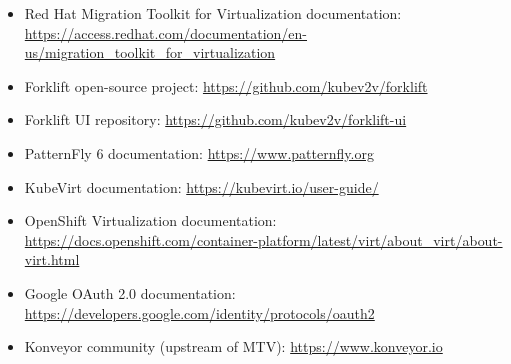 \documentclass[12pt,a4paper]{article}
\begin{document}
\begin{itemize}
  \item Red Hat Migration Toolkit for Virtualization documentation: \\ \url{https://access.redhat.com/documentation/en-us/migration_toolkit_for_virtualization}
  \item Forklift open-source project: \url{https://github.com/kubev2v/forklift}
  \item Forklift UI repository: \url{https://github.com/kubev2v/forklift-ui}
  \item PatternFly 6 documentation: \url{https://www.patternfly.org}
  \item KubeVirt documentation: \url{https://kubevirt.io/user-guide/}
  \item OpenShift Virtualization documentation: \\ \url{https://docs.openshift.com/container-platform/latest/virt/about_virt/about-virt.html}
  \item Google OAuth 2.0 documentation: \url{https://developers.google.com/identity/protocols/oauth2}
  \item Konveyor community (upstream of MTV): \url{https://www.konveyor.io}
\end{itemize}
\end{document}
